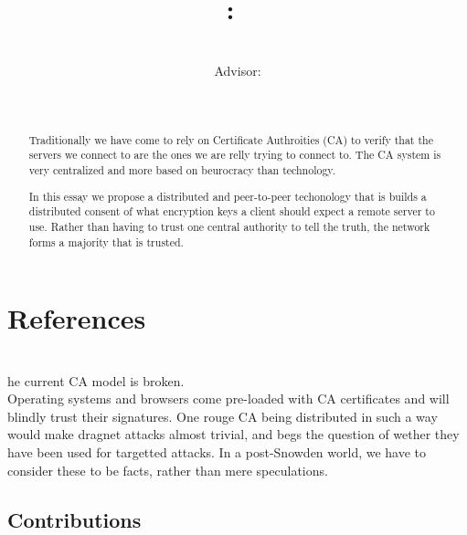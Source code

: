 \documentclass[a4paper]{article}           %
\title{
    \Class:\ \Title
    }
\date{\small{\DueLang\ \DueDate}}
\author{\AuthorName\\Advisor: \ClassInstructor\\}
\newcommand{\tmpsection}[1]{}
\let\tmpsection=\section
\renewcommand{\section}[2]{

    \ifthenelse{
      \equal{#2}{*} %
    }
    {
      \tmpsection{References}
      \tmpsection{\sc{#2} }
    }
    {\tmpsection{\sc{#1} } }
      

}
\begin{document}
\maketitle




\begin{abstract}

  Traditionally we have come to rely on Certificate Authroities (CA)
  to verify that the servers we connect to are the ones we are relly
  trying to connect to. The CA system is very centralized and more
  based on beurocracy than technology. 

  In this essay we propose a distributed and peer-to-peer techonology
  that is builds a distributed consent of what encryption keys a
  client should expect a remote server to use. Rather than having to
  trust one central authority to tell the truth, the network forms a
  majority that is trusted.

\end{abstract}

\section{Introduction}
 

The current CA model is broken. \\

Operating systems and browsers come pre-loaded with CA certificates
and will blindly trust their signatures. One rouge CA being
distributed in such a way would make dragnet attacks almost trivial,
and begs the question of wether they have been used for targetted
attacks. In a post-Snowden world, we have to consider these to be
facts, rather than mere speculations. \\


\subsection{Contributions}
\end{document}
